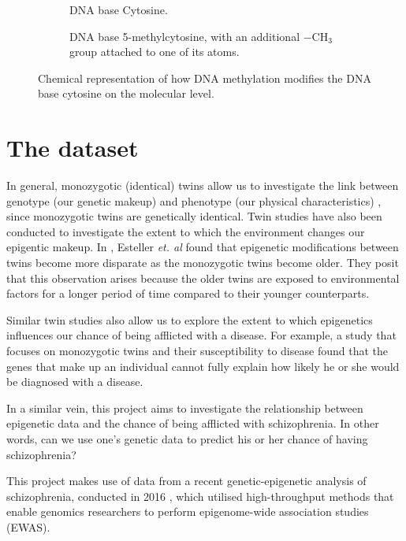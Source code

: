 \documentclass[12pt, twoside, a4paper]{report}
\begin{document}
\begin{figure}[t!]
\begin{subfigure}[t]{0.5\textwidth}
	\centering
	\caption{DNA base Cytosine.}
\end{subfigure}%
\begin{subfigure}[t]{0.5\textwidth}
	\centering
	\caption{DNA base 5-methylcytosine, with an additional $-$CH$_3$ group attached to one of its atoms.}
\end{subfigure}
\caption{Chemical representation of how DNA methylation modifies the DNA base cytosine on the molecular level.}
\label{bg:bio:methylation}
\end{figure}

\section{The dataset} \label{bg_genetic_data}
In general, monozygotic (identical) twins allow us to investigate the link between genotype (our genetic makeup) and phenotype (our physical characteristics) \cite{RefWorks:104, RefWorks:250}, since monozygotic twins are genetically identical. Twin studies have also been conducted to investigate the extent to which the environment changes our epigentic makeup. In \cite{RefWorks:251}, Esteller \textit{et. al} found that epigenetic modifications between twins become more disparate as the monozygotic twins become older. They posit that this observation arises because the older twins are exposed to environmental factors for a longer period of time compared to their younger counterparts.

Similar twin studies also allow us to explore the extent to which epigenetics influences our chance of being afflicted with a disease. For example, a study \cite{RefWorks:105} that focuses on monozygotic twins and their susceptibility to disease found that the genes that make up an individual cannot fully explain how likely he or she would be diagnosed with a disease.

In a similar vein, this project aims to investigate the relationship between epigenetic data and the chance of being afflicted with schizophrenia. In other words, can we use one's genetic data to predict his or her chance of having schizophrenia?

This project makes use of data from a recent genetic-epigenetic analysis of schizophrenia, conducted in 2016 \cite{RefWorks:78}, which utilised high-throughput methods that enable genomics researchers to perform epigenome-wide association studies (EWAS).
\end{document}
